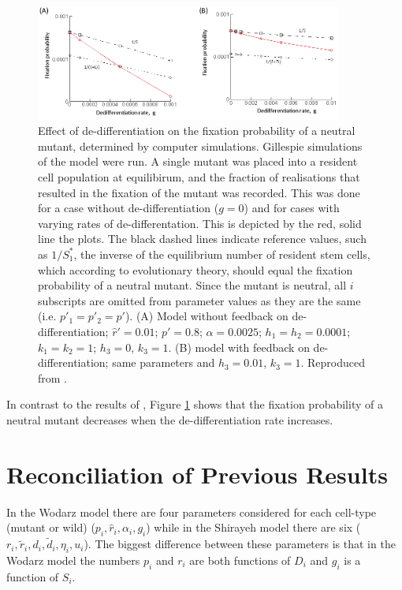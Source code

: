 \documentclass[12pt]{article}
\begin{document}
\begin{figure}[!ht]
\begin{center}
\includegraphics[width=0.9\textwidth]{wodarz.png}
\end{center}
\caption{Effect of de-differentiation on the fixation probability of a neutral mutant, determined by computer simulations. Gillespie simulations of the model were run. A single mutant was placed into a resident cell population at equilibirum, and the fraction of realisations that resulted in the fixation of the mutant was recorded. This was done for a case without de-differentiation ($g=0$) and for cases with varying rates of de-differentation. This is depicted by the red, solid line the plots. The black dashed lines indicate reference values, such as $1/S_1^\ast$, the inverse of the equilibrium number of resident stem cells, which according to evolutionary theory, should equal the fixation probability of a neutral mutant. Since the mutant is neutral, all $i$ subscripts are omitted from parameter values as they are the same (i.e. $p'_1=p'_2=p'$). (A) Model without feedback on de-differentiation; $\hat{r}'=0.01$; $p'=0.8$; $\alpha=0.0025$; $h_1=h_2=0.0001$; $k_1=k_2=1$; $h_3=0$, $k_3=1$. (B) model with feedback on de-differentiation; same parameters and $h_3=0.01$, $k_3=1$. Reproduced from \cite{wodarz}.}\label{wodarzResults}
\end{figure}

In contrast to the results of \cite{mohammad}, Figure \ref{wodarzResults} shows that the fixation probability of a neutral mutant decreases when the de-differentiation rate increases.

\section{Reconciliation of Previous Results}\label{recon}

In the Wodarz model there are four parameters considered for each cell-type (mutant or wild) ($p_i, \hat{r}_i, \alpha_i, g_i$) while in the Shirayeh model there are six ($r_i,\tilde{r}_i, d_i, \tilde{d}_i, \eta_i, u_i$). The biggest difference between these parameters is that in the Wodarz model the numbers $p_i$ and $r_i$ are both functions of $D_i$ and $g_i$ is a function of $S_i$.
\end{document}
